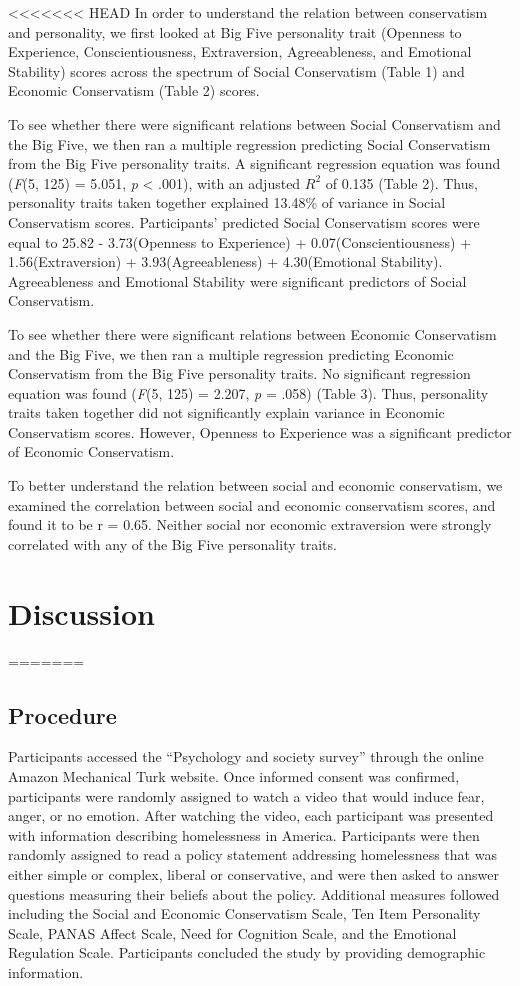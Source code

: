 \documentclass[man]{apa6}
\begin{document}
<<<<<<< HEAD
In order to understand the relation between conservatism and
personality, we first looked at Big Five personality trait (Openness to
Experience, Conscientiousness, Extraversion, Agreeableness, and
Emotional Stability) scores across the spectrum of Social Conservatism
(Table 1) and Economic Conservatism (Table 2) scores.

To see whether there were significant relations between Social
Conservatism and the Big Five, we then ran a multiple regression
predicting Social Conservatism from the Big Five personality traits. A
significant regression equation was found (\emph{F}(5, 125) = 5.051,
\emph{p} \textless{} .001), with an adjusted \(R^2\) of 0.135 (Table 2).
Thus, personality traits taken together explained 13.48\% of variance in
Social Conservatism scores. Participants' predicted Social Conservatism
scores were equal to 25.82 - 3.73(Openness to Experience) +
0.07(Conscientiousness) + 1.56(Extraversion) + 3.93(Agreeableness) +
4.30(Emotional Stability). Agreeableness and Emotional Stability were
significant predictors of Social Conservatism.

To see whether there were significant relations between Economic
Conservatism and the Big Five, we then ran a multiple regression
predicting Economic Conservatism from the Big Five personality traits.
No significant regression equation was found (\emph{F}(5, 125) = 2.207,
\emph{p} = .058) (Table 3). Thus, personality traits taken together did
not significantly explain variance in Economic Conservatism scores.
However, Openness to Experience was a significant predictor of Economic
Conservatism.

To better understand the relation between social and economic
conservatism, we examined the correlation between social and economic
conservatism scores, and found it to be r = 0.65. Neither social nor
economic extraversion were strongly correlated with any of the Big Five
personality traits.

\section{Discussion}\label{discussion}
=======
\hypertarget{procedure}{%
\subsection{Procedure}\label{procedure}}

Participants accessed the \enquote{Psychology and society survey} through the online Amazon Mechanical Turk website. Once informed consent was confirmed, participants were randomly assigned to watch a video that would induce fear, anger, or no emotion. After watching the video, each participant was presented with information describing homelessness in America. Participants were then randomly assigned to read a policy statement addressing homelessness that was either simple or complex, liberal or conservative, and were then asked to answer questions measuring their beliefs about the policy. Additional measures followed including the Social and Economic Conservatism Scale, Ten Item Personality Scale, PANAS Affect Scale, Need for Cognition Scale, and the Emotional Regulation Scale. Participants concluded the study by providing demographic information.
\end{document}
